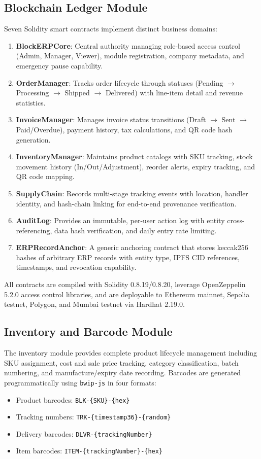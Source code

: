 \documentclass[conference]{IEEEtran}
\begin{document}
\subsection{Blockchain Ledger Module}
Seven Solidity smart contracts implement distinct business domains:

\begin{enumerate}
    \item \textbf{BlockERPCore}: Central authority managing role-based access control (Admin, Manager, Viewer), module registration, company metadata, and emergency pause capability.
    \item \textbf{OrderManager}: Tracks order lifecycle through statuses (Pending $\rightarrow$ Processing $\rightarrow$ Shipped $\rightarrow$ Delivered) with line-item detail and revenue statistics.
    \item \textbf{InvoiceManager}: Manages invoice status transitions (Draft $\rightarrow$ Sent $\rightarrow$ Paid/Overdue), payment history, tax calculations, and QR code hash generation.
    \item \textbf{InventoryManager}: Maintains product catalogs with SKU tracking, stock movement history (In/Out/Adjustment), reorder alerts, expiry tracking, and QR code mapping.
    \item \textbf{SupplyChain}: Records multi-stage tracking events with location, handler identity, and hash-chain linking for end-to-end provenance verification.
    \item \textbf{AuditLog}: Provides an immutable, per-user action log with entity cross-referencing, data hash verification, and daily entry rate limiting.
    \item \textbf{ERPRecordAnchor}: A generic anchoring contract that stores keccak256 hashes of arbitrary ERP records with entity type, IPFS CID references, timestamps, and revocation capability.
\end{enumerate}

All contracts are compiled with Solidity 0.8.19/0.8.20, leverage OpenZeppelin 5.2.0 access control libraries, and are deployable to Ethereum mainnet, Sepolia testnet, Polygon, and Mumbai testnet via Hardhat 2.19.0.

\subsection{Inventory and Barcode Module}
The inventory module provides complete product lifecycle management including SKU assignment, cost and sale price tracking, category classification, batch numbering, and manufacture/expiry date recording. Barcodes are generated programmatically using \texttt{bwip-js} in four formats:
\begin{itemize}
    \item Product barcodes: \texttt{BLK-\{SKU\}-\{hex\}}
    \item Tracking numbers: \texttt{TRK-\{timestamp36\}-\{random\}}
    \item Delivery barcodes: \texttt{DLVR-\{trackingNumber\}}
    \item Item barcodes: \texttt{ITEM-\{trackingNumber\}-\{hex\}}
\end{itemize}
\end{document}
